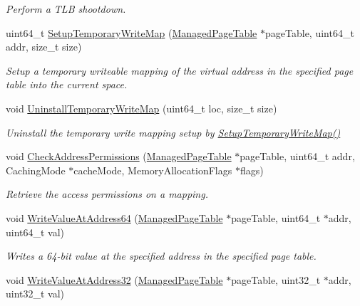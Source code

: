 \begin{DoxyCompactItemize}
\begin{DoxyCompactList}\small\item\em Perform a T\+LB shootdown. \end{DoxyCompactList}\item 
uint64\+\_\+t \hyperlink{group__memory__hal_ga38d7d120822b48d7c31a7e52969aeecb}{Setup\+Temporary\+Write\+Map} (\hyperlink{structManagedPageTable}{Managed\+Page\+Table} $\ast$page\+Table, uint64\+\_\+t addr, size\+\_\+t size)
\begin{DoxyCompactList}\small\item\em Setup a temporary writeable mapping of the virtual address in the specified page table into the current space. \end{DoxyCompactList}\item 
void \hyperlink{group__memory__hal_ga15cb64d29c2d42754d474b5b99c57f5a}{Uninstall\+Temporary\+Write\+Map} (uint64\+\_\+t loc, size\+\_\+t size)
\begin{DoxyCompactList}\small\item\em Uninstall the temporary write mapping setup by \hyperlink{group__memory__hal_ga38d7d120822b48d7c31a7e52969aeecb}{Setup\+Temporary\+Write\+Map()} \end{DoxyCompactList}\item 
void \hyperlink{group__memory__hal_ga3c4c23cb2e658fa0213fda1d71a8fa39}{Check\+Address\+Permissions} (\hyperlink{structManagedPageTable}{Managed\+Page\+Table} $\ast$page\+Table, uint64\+\_\+t addr, Caching\+Mode $\ast$cache\+Mode, Memory\+Allocation\+Flags $\ast$flags)
\begin{DoxyCompactList}\small\item\em Retrieve the access permissions on a mapping. \end{DoxyCompactList}\item 
void \hyperlink{group__memory__hal_ga3bd4c5b1c1c001e27aa3a26c735c64ca}{Write\+Value\+At\+Address64} (\hyperlink{structManagedPageTable}{Managed\+Page\+Table} $\ast$page\+Table, uint64\+\_\+t $\ast$addr, uint64\+\_\+t val)
\begin{DoxyCompactList}\small\item\em Writes a 64-\/bit value at the specified address in the specified page table. \end{DoxyCompactList}\item 
void \hyperlink{group__memory__hal_gac735f7816a3f90773251fee78bb14e14}{Write\+Value\+At\+Address32} (\hyperlink{structManagedPageTable}{Managed\+Page\+Table} $\ast$page\+Table, uint32\+\_\+t $\ast$addr, uint32\+\_\+t val)

\end{DoxyCompactItemize}
